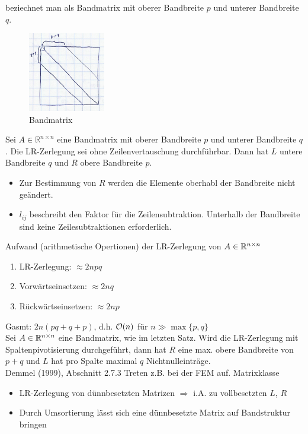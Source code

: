 beziechnet man als Bandmatrix mit oberer Bandbreite $p$ und unterer Bandbreite $q$.
\begin{figure}[htbp]
  \centering
  \includegraphics[width=0.3\textwidth]{figures/bandmatrix.png}
  \caption{Bandmatrix}
\end{figure}
\satz Sei $A \in \mathbb{R}^{n \times n}$ eine Bandmatrix mit oberer Bandbreite $p$
und unterer Bandbreite $q$. Die LR-Zerlegung sei ohne Zeilenvertauschung durchführbar.
Dann hat $L$ untere Bandbreite $q$ und $R$ obere Bandbreite $p$.\\
\beweis
\begin{itemize}
  \item Zur Bestimmung von $R$ werden die Elemente oberhabl der Bandbreite nicht geändert.
  \item $l_{ij}$ beschreibt den Faktor für die Zeilensubtraktion. Unterhalb der Bandbreite
    sind keine Zeilesubtraktionen erforderlich.
\end{itemize}
Aufwand (arithmetische Opertionen) der LR-Zerlegung von $A \in \mathbb{R}^{n \times n}$
\begin{enumerate}
  \item LR-Zerlegung: $\approx 2 n pq$
  \item Vorwärtseinsetzen: $\approx 2 nq$
  \item Rückwärtseinsetzen: $\approx 2 np$
\end{enumerate}
Gasmt: $2n (pq + q + p)$, d.h. $\mathcal{O}(n)$ für $n \gg \max\{ p, q \}$\\
\satz Sei $A \in \mathbb{R}^{n \times n}$ eine Bandmatrix, wie im letzten Satz. Wird die LR-Zerlegung
mit Spaltenpivotisierung durchgeführt, dann hat $R$ eine max. obere Bandbreite von
$p + q$ und $L$ hat pro Spalte maximal $q$ Nichtnulleinträge.\\
\beweis Demmel (1999), Abschnitt 2.7.3
Treten z.B. bei der FEM auf.  Matrixklasse
\begin{itemize}
  \item LR-Zerlegung von dünnbesetzten Matrizen $\Rightarrow$ i.A. zu vollbesetzten $L$, $R$
  \item Durch Umsortierung lässt sich eine dünnbesetzte Matrix auf Bandstruktur bringen
\end{itemize}
